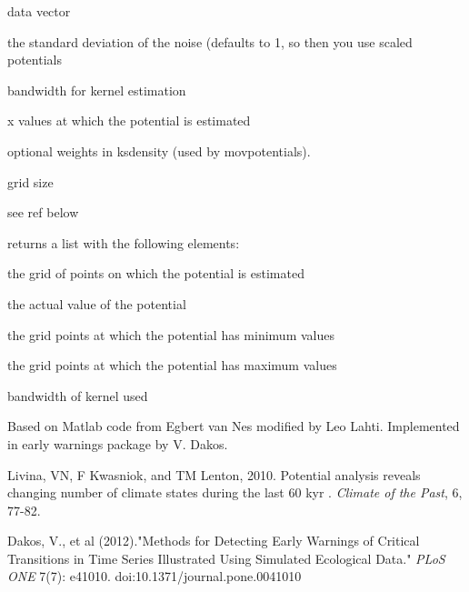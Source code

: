 \documentclass[a4paper]{book}
\begin{document}
\begin{Arguments}
\begin{ldescription}
\item[\code{x}] data vector

\item[\code{std}] the standard deviation of the noise (defaults
to 1, so then you use scaled potentials

\item[\code{bw}] bandwidth for kernel estimation

\item[\code{xi}] x values at which the potential is estimated

\item[\code{weights}] optional weights in ksdensity (used by
movpotentials).

\item[\code{grid.size}] grid size
\end{ldescription}
\end{Arguments}
%
\begin{Details}\relax
see ref below
\end{Details}
%
\begin{Value}
 returns a list with the following
elements:

\begin{ldescription}
\item[\code{xi}] the grid of points on which the potential is
estimated

\item[\code{pot}] the actual value of the potential

\item[\code{minima}] the grid points at which the potential has
minimum values

\item[\code{maxima}] the grid points at which the potential has
maximum values

\item[\code{bw}] bandwidth of kernel used
\end{ldescription}
\end{Value}
%
\begin{Author}\relax
Based on Matlab code from Egbert van Nes modified by Leo
Lahti. Implemented in early warnings package by V. Dakos.
\end{Author}
%
\begin{References}\relax
Livina, VN, F Kwasniok, and TM Lenton, 2010. Potential
analysis reveals changing number of climate states during
the last 60 kyr . \emph{Climate of the Past}, 6, 77-82.

Dakos, V., et al (2012)."Methods for Detecting Early
Warnings of Critical Transitions in Time Series
Illustrated Using Simulated Ecological Data." \emph{PLoS
ONE} 7(7): e41010. doi:10.1371/journal.pone.0041010
\end{References}
\end{document}

